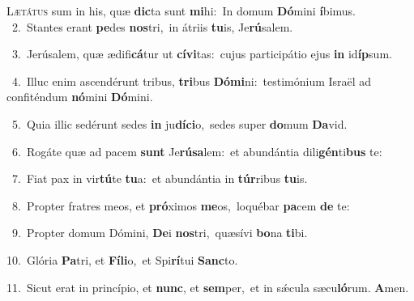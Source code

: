 \lettrine{\initial\textcolor{\initialcolor}{L}}{ætátus} sum in his, quæ \textbf{dic}\-ta sunt \textbf{mi}\-hi:~\star In domum \textbf{Dó}\-mini \textbf{í}\-bimus.\\
{\numbfont\textcolor{\numbcolor}{~2.}}~Stantes erant \textbf{pe}\-des \textbf{nos}\-tri,~\star in átriis \textbf{tu}\-is, Je\-\textbf{rú}\-salem.\par
{\numbfont\textcolor{\numbcolor}{~3.}}~Jerúsalem, quæ ædifi\-\textbf{cá}\-tur ut \textbf{cí}\-\textbf{vi}tas:~\star cujus participátio ejus \textbf{in} id\-\textbf{íp}\-sum.\par
{\numbfont\textcolor{\numbcolor}{~4.}}~Illuc enim ascendérunt tribus, \textbf{tri}\-bus \textbf{Dó}\-\textbf{mi}ni:~\star testimónium Israël ad confiténdum \textbf{nó}\-mini \textbf{Dó}\-mini.\par
{\numbfont\textcolor{\numbcolor}{~5.}}~Quia illic sedérunt sedes \textbf{in} ju\-\textbf{dí}\-\textbf{ci}o,~\star sedes super \textbf{do}\-mum \textbf{Da}\-vid.\par
{\numbfont\textcolor{\numbcolor}{~6.}}~Rogáte quæ ad pacem \textbf{sunt} Je\-\textbf{rú}\-\textbf{sa}lem:~\star et abundántia dili\-\textbf{gén}\-ti\textbf{bus} te:\par
{\numbfont\textcolor{\numbcolor}{~7.}}~Fiat pax in vir\-\textbf{tú}\-te \textbf{tu}\-a:~\star et abundántia in \textbf{túr}\-ribus \textbf{tu}\-is.\par
{\numbfont\textcolor{\numbcolor}{~8.}}~Propter fratres meos, et \textbf{pró}\-ximos \textbf{me}\-os,~\star loquébar \textbf{pa}\-cem \textbf{de} te:\par
{\numbfont\textcolor{\numbcolor}{~9.}}~Propter domum Dómini, \textbf{De}\-i \textbf{nos}\-tri,~\star quæsívi \textbf{bo}\-na \textbf{ti}\-bi.\par
{\numbfont\textcolor{\numbcolor}{10.}}~Glória \textbf{Pa}\-tri, et \textbf{Fí}\-\textbf{li}o,~\star et Spi\-\textbf{rí}\-tui \textbf{Sanc}\-to.\par
{\numbfont\textcolor{\numbcolor}{11.}}~Sicut erat in princípio, et \textbf{nunc}\-, et \textbf{sem}\-per,~\star et in sǽcula sæcu\-\textbf{ló}\-rum. \textbf{A}\-men.\par
